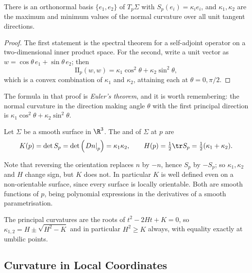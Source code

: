 \begin{corollary}
    There is an orthonormal basis $\{e_1, e_2\}$ of $T_p\Sigma$ with $S_p(e_i) = \kappa_i e_i$, and $\kappa_1, \kappa_2$ are the maximum and minimum values of the normal curvature over all unit tangent directions.
\end{corollary}
\begin{proof}
    The first statement is the spectral theorem for a self-adjoint operator on a two-dimensional inner product space. For the second, write a unit vector as $w = \cos\theta \, e_1 + \sin\theta \, e_2$; then
    $$
    \mathrm{II}_p(w, w) = \kappa_1 \cos^2\theta + \kappa_2\sin^2\theta,
    $$
    which is a convex combination of $\kappa_1$ and $\kappa_2$, attaining each at $\theta = 0, \pi/2$.
\end{proof}

The formula in that proof is \emph{Euler's theorem}, and it is worth remembering: the normal curvature in the direction making angle $\theta$ with the first principal direction is $\kappa_1 \cos^2\theta + \kappa_2\sin^2\theta$.

\begin{definition}
    Let $\Sigma$ be a smooth surface in $\R^3$. The  and  of $\Sigma$ at $p$ are
    $$
    K(p) = \det S_p = \det\left(\left.Dn\right|_p\right) = \kappa_1\kappa_2, \qquad H(p) = \tfrac{1}{2}\tr S_p = \tfrac{1}{2}(\kappa_1 + \kappa_2).
    $$
\end{definition}

Note that reversing the orientation replaces $n$ by $-n$, hence $S_p$ by $-S_p$; so $\kappa_1, \kappa_2$ and $H$ change sign, but $K$ does not. In particular $K$ is well defined even on a non-orientable surface, since every surface is locally orientable. Both are smooth functions of $p$, being polynomial expressions in the derivatives of a smooth parametrisation.

\begin{remark}
    The principal curvatures are the roots of $t^2 - 2Ht + K = 0$, so $\kappa_{1,2} = H \pm \sqrt{H^2-K}$ and in particular $H^2 \geq K$ always, with equality exactly at umbilic points.
\end{remark}

\subsection{Curvature in Local Coordinates}

